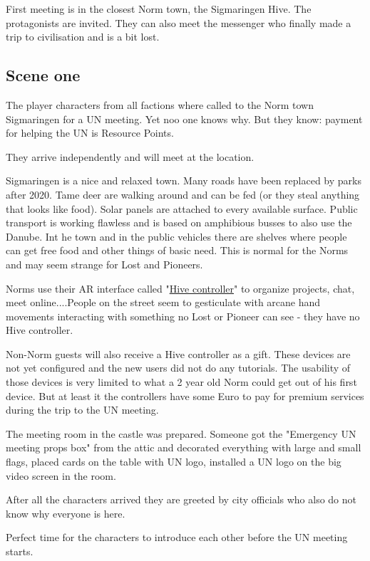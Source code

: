 First meeting is in the closest Norm town, the Sigmaringen Hive. The protagonists are invited. They can also meet the messenger who finally made a trip to civilisation and is a bit lost.

\subsection{Scene one}

The player characters from all factions where called to the Norm town Sigmaringen for a UN meeting. Yet noo one knows why. But they know: payment for helping the UN is Resource Points.

They arrive independently and will meet at the location.

Sigmaringen is a nice and relaxed town. Many roads have been replaced by parks after 2020. Tame deer are walking around and can be fed (or they steal anything that looks like food). Solar panels are attached to every available surface. Public transport is working flawless and is based on amphibious busses to also use the Danube. Int he town and in the public vehicles there are shelves where people can get free food and other things of basic need. This is normal for the Norms and may seem strange for Lost and Pioneers.

Norms use their AR interface called "\hyperref[sec:Hive controller]{Hive controller}" to organize projects, chat, meet online....People on the street seem to gesticulate with arcane hand movements interacting with something no Lost or Pioneer can see - they have no Hive controller.

Non-Norm guests will also receive a Hive controller as a gift. These devices are not yet configured and the new users did not do any tutorials. The usability of those devices is very limited to what a 2 year old Norm could get out of his first device. But at least it the controllers have some Euro to pay for premium services during the trip to the UN meeting.

The meeting room in the castle was prepared. Someone got the "Emergency UN meeting props box" from the attic and decorated everything with large and small flags, placed cards on the table with UN logo, installed a UN logo on the big video screen in the room.

After all the characters arrived they are greeted by city officials who also do not know why everyone is here.

Perfect time for the characters to introduce each other before the UN meeting starts.

